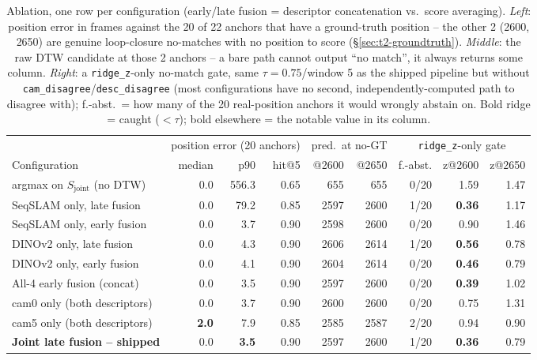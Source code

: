\documentclass[11pt,a4paper]{article}
\begin{document}
\begin{table}[H]
  \centering\footnotesize
  \setlength{\tabcolsep}{4.5pt}
  \begin{tabular}{l rrr rr rrr}
    \toprule
    & \multicolumn{3}{c}{position error (20 anchors)} & \multicolumn{2}{c}{pred.\ at no-GT}
    & \multicolumn{3}{c}{\texttt{ridge\_z}-only gate} \\
    \cmidrule(lr){2-4}\cmidrule(lr){5-6}\cmidrule(lr){7-9}
    Configuration & median & p90 & hit@5 & @2600 & @2650 & f.-abst. & z@2600 & z@2650 \\
    \midrule
    argmax on $S_{\mathrm{joint}}$ (no DTW) & 0.0 & 556.3 & 0.65 & 655 & 655 & 0/20 & 1.59 & 1.47 \\
    SeqSLAM only, late fusion & 0.0 & 79.2 & 0.85 & 2597 & 2600 & 1/20 & \textbf{0.36} & 1.17 \\
    SeqSLAM only, early fusion & 0.0 & 3.7 & 0.90 & 2598 & 2600 & 0/20 & 0.90 & 1.46 \\
    DINOv2 only, late fusion & 0.0 & 4.3 & 0.90 & 2606 & 2614 & 1/20 & \textbf{0.56} & 0.78 \\
    DINOv2 only, early fusion & 0.0 & 4.1 & 0.90 & 2604 & 2614 & 0/20 & \textbf{0.46} & 0.79 \\
    All-4 early fusion (concat) & 0.0 & 3.5 & 0.90 & 2597 & 2600 & 0/20 & \textbf{0.39} & 1.02 \\
    cam0 only (both descriptors) & 0.0 & 3.7 & 0.90 & 2600 & 2600 & 0/20 & 0.75 & 1.31 \\
    cam5 only (both descriptors) & \textbf{2.0} & 7.9 & 0.85 & 2585 & 2587 & 2/20 & 0.94 & 0.90 \\
    \textbf{Joint late fusion -- shipped} & 0.0 & \textbf{3.5} & 0.90 & 2597 & 2600 & 1/20 & \textbf{0.36} & 0.79 \\
    \bottomrule
  \end{tabular}
  \caption{Ablation, one row per configuration (early/late fusion = descriptor concatenation
  vs.\ score averaging). \emph{Left}: position error in frames against the 20 of 22 anchors
  that have a ground-truth position -- the other 2 (2600, 2650) are genuine loop-closure
  no-matches with no position to score (\S\ref{sec:t2-groundtruth}). \emph{Middle}: the raw DTW
  candidate at those 2 anchors -- a bare path cannot output ``no match'', it always returns some
  column. \emph{Right}: a \texttt{ridge\_z}-only no-match gate, same $\tau=0.75$/window 5 as the
  shipped pipeline but without \texttt{cam\_disagree}/\texttt{desc\_disagree} (most
  configurations have no second, independently-computed path to disagree with); f.-abst.\ = how
  many of the 20 real-position anchors it would wrongly abstain on. Bold ridge = caught
  ($<\tau$); bold elsewhere = the notable value in its column.}
  \label{tab:ablation}
\end{table}
\end{document}
